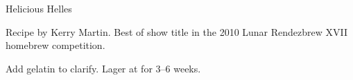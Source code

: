 \begin{recipe}{Helicious Helles}

\begin{aboutblock}
Recipe by Kerry Martin. Best of show title in the 2010 Lunar Rendezbrew XVII
homebrew competition. \sourceaha
\end{aboutblock}


\begin{methodandtiming}
 
\begin{mashsteps}
\end{mashsteps}

\begin{fermentationsteps}
\end{fermentationsteps}

\begin{directions}
Add gelatin to clarify. Lager at  for 3--6 weeks.
\end{directions}

\end{methodandtiming}

\recipebreak

\begin{ingredientsblock}

\begin{malts}
\end{malts}

\begin{hops}
\end{hops}


\end{ingredientsblock}

\end{recipe}

